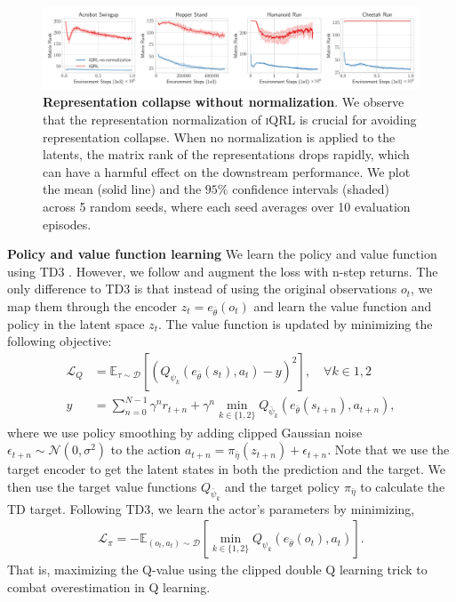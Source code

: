 \documentclass{article}
\theoremstyle{plain}
\theoremstyle{definition}
\theoremstyle{remark}
\newcommand{\our}{\textsc{iQRL}\xspace}
\newcommand{\E}{\mathbb{E}}
\begin{document}
\begin{figure}[ht]
	\vskip 0.2in
	\begin{center}
		\centerline{\includegraphics[width=1.0\textwidth]{./figs/rank-comparison-z1.pdf}}
		\caption{\textbf{Representation collapse without normalization}. We observe that the representation normalization of \our is crucial for avoiding representation collapse. When no normalization is applied to the latents, the matrix rank of the representations drops rapidly, which can have a harmful effect on the downstream performance. We plot the mean (solid line) and the $95\%$ confidence intervals (shaded) across 5 random seeds, where each seed averages over 10 evaluation episodes.}
		\label{fig:rank-comparison-z1}
	\end{center}
	\vskip -0.2in
\end{figure}



\textbf{Policy and value function learning}
We learn the policy and value function using TD3 \citep{fujimotoAddressingFunctionApproximation2018}.
However, we follow \citet{yaratsMasteringVisualContinuous2021,zhaoSimplifiedTemporalConsistency2023}
and augment the loss with n-step returns.
The only difference to TD3 is that instead of using the original observations $o_{t}$, we map them through the
encoder $z_{t} = e_{\bar{\theta}}(o_{t})$ and learn the value function and policy in the latent space $z_{t}$.
The value function is updated by minimizing the following objective:
\begin{align} \label{eq:value-loss}
  \mathcal{L}_{Q} &= \E_{\tau \sim \mathcal{D}} \left[ (Q_{\psi_{k}}(e_{\bar{\theta}}(s_{t}), a_{t}) - y)^{2}  \right], \quad  \forall k \in 1, 2 \\
  y &= \sum_{n=0}^{N-1} \gamma^{n} r_{t+n} + \gamma^{n} \min_{k \in \{1,2\}} Q_{\bar{\psi}_{k}}(e_{\bar{\theta}}(s_{t+n}), a_{t+n}), \nonumber
\end{align}
where we use policy smoothing by adding clipped Gaussian noise $\epsilon_{t+n} \sim \mathcal{N} (0,\sigma^{2})$ to the
action $a_{t+n} = \pi_{\bar{\eta}}(z_{t+n}) + \epsilon_{t+n}$.
Note that we use the target encoder to get the latent states in both the prediction and the target.
We then use the target value functions $Q_{\bar{\psi}_{k}}$ and the target policy $\pi_{\bar{\eta}}$ to calculate the TD target.
Following TD3, we learn the actor's parameters by minimizing,
%
\begin{align} \label{eq:policy-loss}
 \mathcal{L}_{\pi} = - \E_{(o_{t}, a_{t}) \sim \mathcal{D}} \left[ \min_{k\in\{1,2\}} Q_{\psi_{k}}(e_{\bar{\theta}}(o_{t}), a_{t}) \right].
\end{align}
%
That is, maximizing the Q-value using the clipped double Q learning trick to combat overestimation in Q learning.
\end{document}
